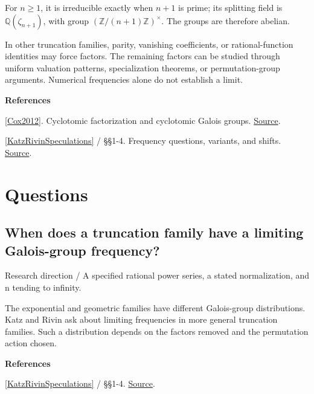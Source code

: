 \documentclass[11pt,a4paper,oneside,openany]{book}
\newcommand{\atlasdisplay}[1]{\par\begingroup\centering\vspace{3pt}\noindent\adjustbox{max width=\linewidth}{\(\displaystyle #1\)}\par\vspace{5pt}\endgroup}
\newenvironment{sources}{\par\smallskip\begingroup\footnotesize\color{atlasgray}\leftskip=10pt\setlength{\parskip}{2pt}}{\par\endgroup\smallskip}
\begin{document}
\atlasdisplay{1+x+\cdots+x^n=\prod_{\substack{d\mid n+1\\d>1}}\Phi_d(x).}
\color{black} For \(n\ge1\), it is irreducible exactly when \(n+1\) is prime; its splitting field is \(\mathbb Q(\zeta_{n+1})\), with group \((\mathbb Z/(n+1)\mathbb Z)^\times\). The groups are therefore abelian.\par
\color{black} In other truncation families, parity, vanishing coefficients, or rational-function identities may force factors. The remaining factors can be studied through uniform valuation patterns, specialization theorems, or permutation-group arguments. Numerical frequencies alone do not establish a limit.\par
\begin{sources}
\textbf{References}\par\smallskip
\noindent\hyperlink{ref:Cox2012}{[Cox2012]}. Cyclotomic factorization and cyclotomic Galois groups. \href{https://onlinelibrary.wiley.com/doi/book/10.1002/9781118218457}{Source}.\par
\noindent\hyperlink{ref:KatzRivinSpeculations}{[KatzRivinSpeculations]} / §§1-4. Frequency questions, variants, and shifts. \href{https://web.math.princeton.edu/~nmk/kGalois_11bis.pdf}{Source}.\par
\end{sources}\color{black}
\section*{Questions}
\subsection*{When does a truncation family have a limiting Galois-group frequency?}
{\small\sffamily\color{atlasgold}Research direction / A specified rational power series, a stated normalization, and n tending to infinity.}\par\smallskip
\color{black} The exponential and geometric families have different Galois-group distributions. Katz and Rivin ask about limiting frequencies in more general truncation families. Such a distribution depends on the factors removed and the permutation action chosen.\par
\begin{sources}
\textbf{References}\par\smallskip
\noindent\hyperlink{ref:KatzRivinSpeculations}{[KatzRivinSpeculations]} / §§1-4.  \href{https://web.math.princeton.edu/~nmk/kGalois_11bis.pdf}{Source}.\par
\end{sources}\color{black}
\end{document}
